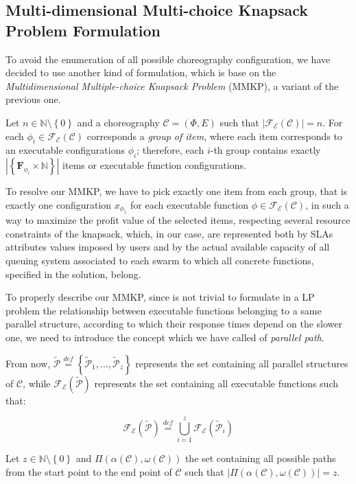 \documentclass[12pt,a4paper]{report}
\newcommand{\mathDef}{\overset{\textit{def}}{=}}
\newcommand{\N}{\mathbb{N}}
\newcommand{\SetMinusZero}{\setminus \left\{0\right\}}
\begin{document}
\subsection{Multi-dimensional Multi-choice Knapsack Problem Formulation}

To avoid the enumeration of all possible choreography configuration, we have decided to use another kind of formulation, which is base on the \textit{Multidimensional Multiple-choice Knapsack Problem} (MMKP), a variant of the previous one. 

Let $n \in \N \setminus \left\{0\right\}$ and a choreography $\mathcal{C} = (\Phi,E)$ such that $|\mathscr{F_E}(\mathcal{C})| = n$. For each $\phi_i \in \mathscr{F_E}(\mathcal{C})$ corresponds a \textit{group of item}, where each item corresponds to an executable configurations $\phi_i$; therefore, each $i$-th group contains exactly $|\left\{ \textbf{F}_{\phi_{i}} \times \N \right\}|$ items or executable function configurations.

To resolve our MMKP, we have to pick exactly one item from each group, that is exactly one configuration $x_{\phi_1}$ for each executable function $\phi \in \mathscr{F_E}(\mathcal{C})$, in such a way to maximize the profit value of the selected items, respecting several resource constraints of the knapsack, which, in our case, are represented both by SLAs attributes values imposed by users and by the actual available capacity of all queuing system associated to each swarm to which all concrete functions, specified in the solution, belong.

To properly describe our MMKP, since is not trivial to formulate in a LP problem the relationship between executable functions belonging to a same parallel structure, according to which their response times depend on the slower one, we need to introduce the concept which we have called of \textit{parallel path}.

From now, $\mathcal{\widetilde{P}} \mathDef \left\{\mathcal{\widetilde{P}}_1,\ldots,\mathcal{\widetilde{P}}_z \right\}$ represents the set containing all parallel structures of $\mathcal{C}$, while $\mathscr{F_E}(\mathcal{\widetilde{P}})$ represents the set containing all executable functions such that:

\begin{equation}
\mathscr{F_E}(\mathcal{\widetilde{P}}) \mathDef \bigcup_{i=1}^z \mathscr{F_E}(\mathcal{\widetilde{P}}_i)
\end{equation}

Let $z \in \N \SetMinusZero$ and $\Pi(\alpha(\mathcal{C}),\omega(\mathcal{C}))$ the set containing all possible paths from the start point to the end point of $\mathcal{C}$ such that $|\Pi(\alpha(\mathcal{C}),\omega(\mathcal{C}))| = z$. 
\end{document}
